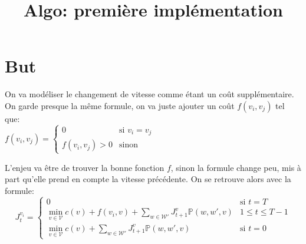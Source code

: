 \documentclass[10pt,a4paper]{article}
\title{Algo: première implémentation}
\newcommand{\W}{\mathcal{W}}
\newcommand{\V}{\mathcal{V}}
\begin{document}
\maketitle

\section{But}
On va modéliser le changement de vitesse comme étant un coût
supplémentaire. On garde presque la même formule, on va juste ajouter
un coût $f(v_i,v_j)$ tel que:\\
$f(v_i,v_j)=
\begin{cases}
  0 & \text{si } v_i=v_j \\
  f(v_i,v_j)>0 & \text{sinon}
\end{cases}
$

L'enjeu va être de trouver la bonne fonction $f$, sinon la formule
change peu, mis à part qu'elle prend en compte la vitesse
précédente. On se retrouve alors avec la formule:
\begin{equation}
  J_t^{v_i} =
  \begin{cases}
    0 & \text{si } t=T\\
    \min_{v\in\V}
    c(v)+f(v_i,v)+\sum_{w\in\W'}J_{t+1}^v\mathbb{P}(w,w',v) & 1\leq
    t\leq T-1\\
        \min_{v\in\V}
    c(v)+\sum_{w\in\W'}J_{t+1}^v\mathbb{P}(w,w',v) & \text{si }t=0

  \end{cases}
\end{equation}
\end{document}
